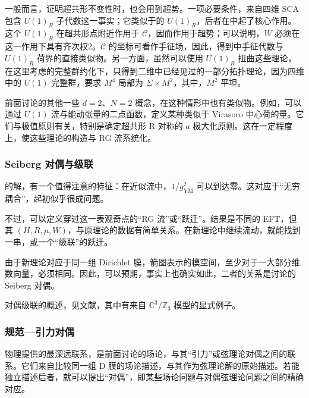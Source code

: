 一般而言，证明超共形不变性时，也会用到超势。一项必要条件，来自四维 SCA 包含 $U(1)_R$ 子代数这一事实；它类似于的 $U(1)_R$，后者在中起了核心作用。这个 $U(1)_R$ 在超共形点附近作用于 $\mathcal{C}$，因而作用于超势；可以说明，$W$ 必须在这一作用下具有齐次权2。$\mathcal{C}$ 的坐标可看作手征场，因此，得到中手征代数与 $U(1)_R$ 荷界的直接类似物。另一方面，虽然可以使用 $U(1)_R$ 扭曲这些理论，在这里考虑的完整群约化下，只得到二维中已经见过的一部分拓扑理论，因为四维中的 $U(1)$ 完整群，要求 $M^4$ 局部为 $\Sigma\times M^2$，其中，$M^2$ 平坦。

前面讨论的其他一些 $d=2$、$N=2$ 概念，在这种情形中也有类似物。例如，可以通过 $U(1)$ 流与能动张量的二点函数，定义某种类似于 Virasoro 中心荷的量。它们与极值原则有关，特别是确定超共形 R 对称的 $a$ 极大化原则。这在一定程度上，使这些理论的构造与 RG 流系统化。

\subsubsection{Seiberg 对偶与级联}\label{sec:5.4.6.6}

的解，有一个值得注意的特征：在近似流中，$1/g_{\mathrm{YM}}^2$ 可以到达零。这对应于“无穷耦合”，起初似乎很成问题。

不过，可以定义穿过这一表观奇点的“RG 流”或“跃迁”。结果是不同的 EFT，但其 $(H,R,\mu,W)$，与原理论的数据有简单关系。在新理论中继续流动，就能找到一串，或一个“级联”的跃迁。

由于新理论对应于同一组 Dirichlet 膜，箭图表示的模空间，至少对于一大部分维数向量，必须相同。因此，可以预期，事实上也确实如此，二者的关系是讨论的 Seiberg 对偶。

对偶级联的概述，见文献，其中有来自 $\mathbb{C}^3/\mathbb{Z}_3$ 模型的显式例子。

\subsubsection{规范—引力对偶}\label{sec:5.4.6.7}

物理提供的最深远联系，是前面讨论的场论，与其“引力”或弦理论对偶之间的联系。它们来自比较同一组 D 膜的场论描述，与其作为弦理论解的原始描述。若能独立描述后者，就可以提出“对偶”，即某些场论问题与对偶弦理论问题之间的精确对应。

